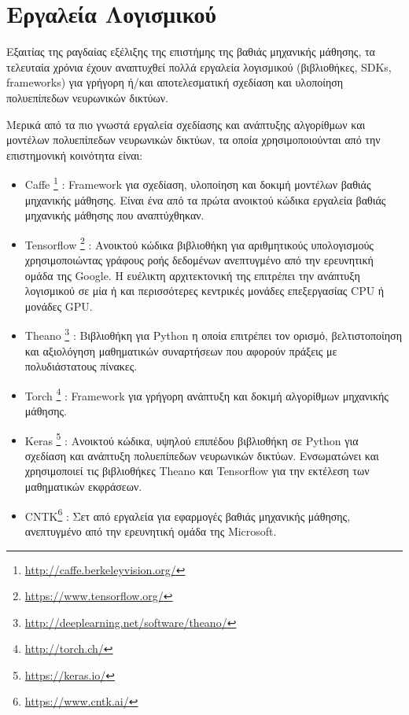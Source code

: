\section{Εργαλεία Λογισμικού}
\label{sec:dnn_sw}

Εξαιτίας της ραγδαίας εξέλιξης της επιστήμης της βαθιάς μηχανικής μάθησης,
τα τελευταία χρόνια έχουν αναπτυχθεί πολλά εργαλεία λογισμικού (βιβλιοθήκες, SDKs, frameworks)
για γρήγορη ή/και αποτελεσματική σχεδίαση και υλοποίηση πολυεπίπεδων νευρωνικών δικτύων.

Μερικά από τα πιο γνωστά εργαλεία
σχεδίασης και ανάπτυξης αλγορίθμων και μοντέλων πολυεπίπεδων νευρωνικών δικτύων, τα οποία
χρησιμοποιούνται από την επιστημονική κοινότητα είναι:
\begin{itemize}
  \item{Caffe \footnote{\url{http://caffe.berkeleyvision.org/}} %
      \cite{jia2014caffe}:
    Framework για σχεδίαση, υλοποίηση και δοκιμή μοντέλων βαθιάς μηχανικής μάθησης.
    Είναι ένα από τα πρώτα ανοικτού κώδικα εργαλεία βαθιάς μηχανικής μάθησης που αναπτύχθηκαν.}
  \item{Tensorflow \footnote{\url{https://www.tensorflow.org/}} %
      \cite{DBLP:journals/corr/AbadiBCCDDDGIIK16}:
    Ανοικτού κώδικα βιβλιοθήκη για αριθμητικούς υπολογισμούς χρησιμοποιώντας
    γράφους ροής δεδομένων ανεπτυγμένο από την ερευνητική ομάδα της Google.
    Η ευέλικτη αρχιτεκτονική της επιτρέπει την ανάπτυξη
    λογισμικού σε μία ή και περισσότερες κεντρικές μονάδες επεξεργασίας CPU ή μονάδες GPU.}
  \item{Theano \footnote{\url{http://deeplearning.net/software/theano/}}
      \cite{2016arXiv160502688full}\cite{bergstra+al:2010-scipy}\cite{Bastien-Theano-2012}: %
      Βιβλιοθήκη για Python η οποία επιτρέπει τον ορισμό, βελτιστοποίηση και αξιολόγηση
      μαθηματικών συναρτήσεων που αφορούν πράξεις με πολυδιάστατους πίνακες.}
  \item{Torch \footnote{\url{http://torch.ch/}} %
      \cite{collobert2002torch}\cite{collobert2011torch7}\cite{collobert2012implementing}:
    Framework για γρήγορη ανάπτυξη και δοκιμή αλγορίθμων μηχανικής μάθησης.}
  \item{Keras \footnote{\url{https://keras.io/}} \cite{chollet2015keras}:
      Ανοικτού κώδικα, υψηλού επιπέδου βιβλιοθήκη σε Python για σχεδίαση και ανάπτυξη
      πολυεπίπεδων νευρωνικών δικτύων. Ενσωματώνει και χρησιμοποιεί
      τις βιβλιοθήκες Theano και Tensorflow για την εκτέλεση των μαθηματικών εκφράσεων.}
  \item{CNTK\footnote{\url{https://www.cntk.ai/}} \cite{Seide:2016:CMO:2939672.2945397}:
    Σετ από εργαλεία για εφαρμογές βαθιάς μηχανικής μάθησης, ανεπτυγμένο από την ερευνητική ομάδα της Microsoft.}
\end{itemize}

